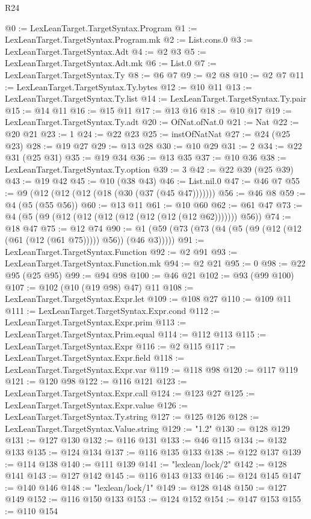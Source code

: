 \begin{lexlean}{R24}
\begin{coremodule}
@0 := LexLeanTarget.TargetSyntax.Program
@1 := LexLeanTarget.TargetSyntax.Program.mk
@2 := List.cons.{0}
@3 := LexLeanTarget.TargetSyntax.Adt
@4 := @2 @3
@5 := LexLeanTarget.TargetSyntax.Adt.mk
@6 := List.{0}
@7 := LexLeanTarget.TargetSyntax.Ty
@8 := @6 @7
@9 := @2 @8
@10 := @2 @7
@11 := LexLeanTarget.TargetSyntax.Ty.bytes
@12 := @10 @11
@13 := LexLeanTarget.TargetSyntax.Ty.list
@14 := LexLeanTarget.TargetSyntax.Ty.pair
@15 := @14 @11
@16 := @15 @11
@17 := @13 @16
@18 := @10 @17
@19 := LexLeanTarget.TargetSyntax.Ty.adt
@20 := OfNat.ofNat.{0}
@21 := Nat
@22 := @20 @21
@23 := 1
@24 := @22 @23
@25 := instOfNatNat
@27 := @24 (@25 @23)
@28 := @19 @27
@29 := @13 @28
@30 := @10 @29
@31 := 2
@34 := @22 @31 (@25 @31)
@35 := @19 @34
@36 := @13 @35
@37 := @10 @36
@38 := LexLeanTarget.TargetSyntax.Ty.option
@39 := 3
@42 := @22 @39 (@25 @39)
@43 := @19 @42
@45 := @10 (@38 @43)
@46 := List.nil.{0}
@47 := @46 @7
@55 := @9 (@12 (@12 (@12 (@18 (@30 (@37 (@45 @47)))))))
@56 := @46 @8
@59 := @4 (@5 (@55 @56))
@60 := @13 @11
@61 := @10 @60
@62 := @61 @47
@73 := @4 (@5 (@9 (@12 (@12 (@12 (@12 (@12 (@12 (@12 @62))))))) @56))
@74 := @18 @47
@75 := @12 @74
@90 := @1 (@59 (@73 (@73 (@4 (@5 (@9 (@12 (@12 (@61 (@12 (@61 @75))))) @56)) (@46 @3)))))
@91 := LexLeanTarget.TargetSyntax.Function
@92 := @2 @91
@93 := LexLeanTarget.TargetSyntax.Function.mk
@94 := @2 @21
@95 := 0
@98 := @22 @95 (@25 @95)
@99 := @94 @98
@100 := @46 @21
@102 := @93 (@99 @100)
@107 := @102 (@10 (@19 @98) @47) @11
@108 := LexLeanTarget.TargetSyntax.Expr.let
@109 := @108 @27
@110 := @109 @11
@111 := LexLeanTarget.TargetSyntax.Expr.cond
@112 := LexLeanTarget.TargetSyntax.Expr.prim
@113 := LexLeanTarget.TargetSyntax.Prim.equal
@114 := @112 @113
@115 := LexLeanTarget.TargetSyntax.Expr
@116 := @2 @115
@117 := LexLeanTarget.TargetSyntax.Expr.field
@118 := LexLeanTarget.TargetSyntax.Expr.var
@119 := @118 @98
@120 := @117 @119
@121 := @120 @98
@122 := @116 @121
@123 := LexLeanTarget.TargetSyntax.Expr.call
@124 := @123 @27
@125 := LexLeanTarget.TargetSyntax.Expr.value
@126 := LexLeanTarget.TargetSyntax.Ty.string
@127 := @125 @126
@128 := LexLeanTarget.TargetSyntax.Value.string
@129 := "1.2"
@130 := @128 @129
@131 := @127 @130
@132 := @116 @131
@133 := @46 @115
@134 := @132 @133
@135 := @124 @134
@137 := @116 @135 @133
@138 := @122 @137
@139 := @114 @138
@140 := @111 @139
@141 := "lexlean/lock/2"
@142 := @128 @141
@143 := @127 @142
@145 := @116 @143 @133
@146 := @124 @145
@147 := @140 @146
@148 := "lexlean/lock/1"
@149 := @128 @148
@150 := @127 @149
@152 := @116 @150 @133
@153 := @124 @152
@154 := @147 @153
@155 := @110 @154

\end{coremodule}
\end{lexlean}
